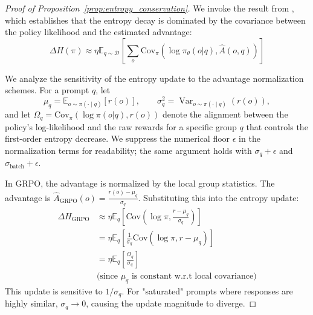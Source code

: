 \documentclass{article}
\theoremstyle{plain}
\theoremstyle{definition}
\theoremstyle{remark}
\begin{document}
\begin{proof}[Proof of Proposition~\ref{prop:entropy_conservation}]
We invoke the result from \citet{cui2025entropy}, which establishes that the entropy decay is dominated by the covariance between the policy likelihood and the estimated advantage:
\begin{equation*}
    \Delta H(\pi) \approx \eta \mathbb{E}_{q \sim \mathcal{D}} \left[ \sum_{o} \text{Cov}_{\pi}\left( \log \pi_\theta(o|q), \hat{A}(o, q) \right) \right]
\end{equation*}


We analyze the sensitivity of the entropy update to the advantage normalization schemes. 
For a prompt $q$, let
\[
    \mu_q = \mathbb{E}_{o\sim \pi(\cdot\mid q)}[r(o)],
    \qquad
    \sigma_q^2 = \operatorname{Var}_{o\sim \pi(\cdot\mid q)}(r(o)),
\]
and let $\Omega_q = \text{Cov}_{\pi}(\log \pi(o|q), r(o))$ denote the alignment between the policy's log-likelihood and the raw rewards for a specific group $q$ that controls the
first-order entropy decrease. We suppress the numerical floor $\epsilon$ in the normalization terms
for readability; the same argument holds with $\sigma_q+\epsilon$ and
$\sigma_{\mathrm{batch}}+\epsilon$.

In GRPO, the advantage is normalized by the local group statistics. The advantage is $\hat{A}_{\text{GRPO}}(o) = \frac{r(o) - \mu_q}{\sigma_q}$. Substituting this into the entropy update:
\begin{align*}
    \Delta H_{\text{GRPO}} &\approx \eta \mathbb{E}_{q} \left[ \text{Cov}\left( \log \pi, \frac{r - \mu_q}{\sigma_q} \right) \right] \\
    &= \eta \mathbb{E}_{q} \left[ \frac{1}{\sigma_q} \text{Cov}( \log \pi, r - \mu_q ) \right] \\
    &= \eta \mathbb{E}_{q} \left[ \frac{\Omega_q}{\sigma_q} \right] \\
    & \text{(since $\mu_q$ is constant w.r.t local covariance)}
\end{align*}
This update is sensitive to $1/\sigma_q$. For "saturated" prompts where responses are highly similar, $\sigma_q \to 0$, causing the update magnitude to diverge.


\end{proof}
\end{document}
